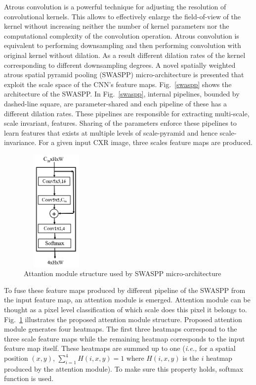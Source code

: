 Atrous convolution is a powerful technique for adjusting the resolution of convolutional kernels. This allows to effectively enlarge the field-of-view of the kernel without increasing neither the number of kernel parameters nor the computational complexity of the convolution operation. Atrous convolution is equivalent to performing downsampling and then performing convolution with original kernel without dilation. As a result different dilation rates of the kernel corresponding to different downsampling degrees. A novel spatially weighted atrous spatial pyramid pooling (SWASPP) micro-architecture is presented that exploit the scale space of the CNN's feature maps. Fig.~\ref{swaspp} shows the architecture of the SWASPP. In Fig.~\ref{swaspp}, internal pipelines, bounded by dashed-line square, are parameter-shared and each pipeline of these has a different dilation rates. These pipelines are responsible for extracting multi-scale, scale invariant, features. Sharing of the parameters enforce these pipelines to learn features that exists at multiple levels of scale-pyramid and hence scale-invariance. For a given input CXR image, three scales feature maps are produced.
\begin{center}
\begin{figure}[htbp]
\centerline{\includegraphics[height=60mm,width=3.5cm]{Figures/AttentionModUl.PNG}}
\caption{Attantion module structure used by SWASPP micro-architecture}
\label{attain}
\end{figure}
\end{center}
To fuse these feature maps produced by different pipeline of the SWASPP from the input feature map, an attention module is emerged. Attention module can be thought as a pixel level classification of which scale does this pixel it belongs to. Fig.~\ref{attain} illustrates the proposed attention module structure. Proposed attention module generates four heatmaps. The first three heatmaps correspond to the three scale feature maps while the remaining heatmap corresponds to the input feature map itself. These heatmaps are summed  up to one (\textit{i.e.,} for a  spatial position 
$(x, y)$, $\sum_{i =1}^{4} H(i,x,y) = 1$ where $H(i,x,y)$ is the $i$ heatmap produced by the attention module). To make sure this property holds, softmax function is used. 

